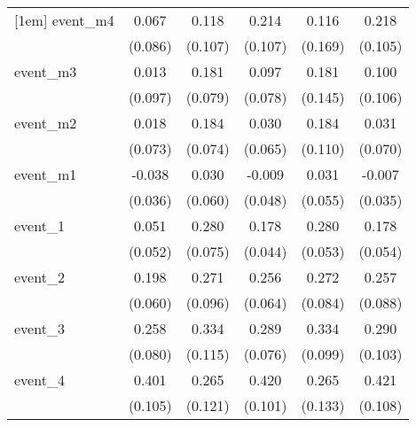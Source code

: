 {\begin{tabular}{l*{5}{c}}
[1em]
event\_m4    &       0.067         &       0.118         &       0.214\sym{*}  &       0.116         &       0.218\sym{*}  \\
            &     (0.086)         &     (0.107)         &     (0.107)         &     (0.169)         &     (0.105)         \\
[1em]
event\_m3    &       0.013         &       0.181\sym{*}  &       0.097         &       0.181         &       0.100         \\
            &     (0.097)         &     (0.079)         &     (0.078)         &     (0.145)         &     (0.106)         \\
[1em]
event\_m2    &       0.018         &       0.184\sym{*}  &       0.030         &       0.184         &       0.031         \\
            &     (0.073)         &     (0.074)         &     (0.065)         &     (0.110)         &     (0.070)         \\
[1em]
event\_m1    &      -0.038         &       0.030         &      -0.009         &       0.031         &      -0.007         \\
            &     (0.036)         &     (0.060)         &     (0.048)         &     (0.055)         &     (0.035)         \\
[1em]
event\_1     &       0.051         &       0.280\sym{***}&       0.178\sym{***}&       0.280\sym{***}&       0.178\sym{***}\\
            &     (0.052)         &     (0.075)         &     (0.044)         &     (0.053)         &     (0.054)         \\
[1em]
event\_2     &       0.198\sym{***}&       0.271\sym{**} &       0.256\sym{***}&       0.272\sym{**} &       0.257\sym{**} \\
            &     (0.060)         &     (0.096)         &     (0.064)         &     (0.084)         &     (0.088)         \\
[1em]
event\_3     &       0.258\sym{**} &       0.334\sym{**} &       0.289\sym{***}&       0.334\sym{***}&       0.290\sym{**} \\
            &     (0.080)         &     (0.115)         &     (0.076)         &     (0.099)         &     (0.103)         \\
[1em]
event\_4     &       0.401\sym{***}&       0.265\sym{*}  &       0.420\sym{***}&       0.265\sym{*}  &       0.421\sym{***}\\
            &     (0.105)         &     (0.121)         &     (0.101)         &     (0.133)         &     (0.108)         \\

\end{tabular}}
